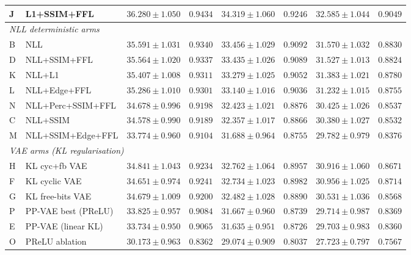 \documentclass[12pt, a4paper, twoside, openright]{book}
\begin{document}
\begin{landscape}
\begin{longtable}{llcccccc}
J & L1+SSIM+FFL                  & $36.280 \pm 1.050$ & $0.9434$ & $34.319 \pm 1.060$ & $0.9246$ & $32.585 \pm 1.044$ & $0.9049$ \\
\midrule
\multicolumn{8}{l}{\textit{NLL deterministic arms}} \\
B & NLL                           & $35.591 \pm 1.031$ & $0.9340$ & $33.456 \pm 1.029$ & $0.9092$ & $31.570 \pm 1.032$ & $0.8830$ \\
D & NLL+SSIM+FFL                  & $35.564 \pm 1.020$ & $0.9337$ & $33.435 \pm 1.026$ & $0.9089$ & $31.527 \pm 1.013$ & $0.8824$ \\
K & NLL+L1                        & $35.407 \pm 1.008$ & $0.9311$ & $33.279 \pm 1.025$ & $0.9052$ & $31.383 \pm 1.021$ & $0.8780$ \\
L & NLL+Edge+FFL                  & $35.286 \pm 1.010$ & $0.9301$ & $33.140 \pm 1.016$ & $0.9036$ & $31.232 \pm 1.015$ & $0.8755$ \\
N & NLL+Perc+SSIM+FFL             & $34.678 \pm 0.996$ & $0.9198$ & $32.423 \pm 1.021$ & $0.8876$ & $30.425 \pm 1.026$ & $0.8537$ \\
C & NLL+SSIM                      & $34.578 \pm 0.990$ & $0.9189$ & $32.357 \pm 1.017$ & $0.8866$ & $30.380 \pm 1.027$ & $0.8532$ \\
M & NLL+SSIM+Edge+FFL             & $33.774 \pm 0.960$ & $0.9104$ & $31.688 \pm 0.964$ & $0.8755$ & $29.782 \pm 0.979$ & $0.8376$ \\
\midrule
\multicolumn{8}{l}{\textit{VAE arms (KL regularisation)}} \\
H & KL cyc+fb VAE                 & $34.841 \pm 1.043$ & $0.9234$ & $32.762 \pm 1.064$ & $0.8957$ & $30.916 \pm 1.060$ & $0.8671$ \\
F & KL cyclic VAE                  & $34.651 \pm 0.974$ & $0.9241$ & $32.734 \pm 1.023$ & $0.8982$ & $30.956 \pm 1.025$ & $0.8714$ \\
G & KL free-bits VAE               & $34.679 \pm 1.009$ & $0.9200$ & $32.482 \pm 1.028$ & $0.8890$ & $30.531 \pm 1.036$ & $0.8568$ \\
P & PP-VAE best (PReLU)            & $33.825 \pm 0.957$ & $0.9084$ & $31.667 \pm 0.960$ & $0.8739$ & $29.714 \pm 0.987$ & $0.8369$ \\
E & PP-VAE (linear KL)             & $33.734 \pm 0.950$ & $0.9065$ & $31.635 \pm 0.951$ & $0.8726$ & $29.703 \pm 0.983$ & $0.8360$ \\
O & PReLU ablation                 & $30.173 \pm 0.963$ & $0.8362$ & $29.074 \pm 0.909$ & $0.8037$ & $27.723 \pm 0.797$ & $0.7567$ \\

\end{longtable}
\end{landscape}
\end{document}
